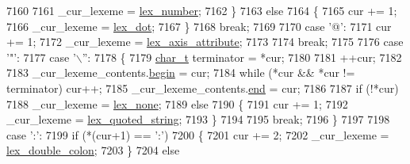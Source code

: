 \begin{DoxyCode}
7160                     
7161                     \_cur\_lexeme = \hyperlink{pugixml_8cpp_a1fdd6d0a63acbba1491ab331ddce4ac9abe562e581d64a34b55b3d9b38db2e480}{lex\_number};
7162                 \}
7163                 \textcolor{keywordflow}{else}
7164                 \{
7165                     cur += 1;
7166                     \_cur\_lexeme = \hyperlink{pugixml_8cpp_a1fdd6d0a63acbba1491ab331ddce4ac9aa0709f7aad925098c9b62379206a536b}{lex\_dot};
7167                 \}
7168                 \textcolor{keywordflow}{break};
7169 
7170             \textcolor{keywordflow}{case} \textcolor{charliteral}{'@'}:
7171                 cur += 1;
7172                 \_cur\_lexeme = \hyperlink{pugixml_8cpp_a1fdd6d0a63acbba1491ab331ddce4ac9a408fe857bc6c9b3a148ab798d0ad34e7}{lex\_axis\_attribute};
7173 
7174                 \textcolor{keywordflow}{break};
7175 
7176             \textcolor{keywordflow}{case} \textcolor{charliteral}{'"'}:
7177             \textcolor{keywordflow}{case} \textcolor{charliteral}{'\(\backslash\)''}:
7178             \{
7179                 \hyperlink{namespacepugi_aef5a7a62cba0507542220ea15afe39df}{char\_t} terminator = *cur;
7180 
7181                 ++cur;
7182 
7183                 \_cur\_lexeme\_contents.\hyperlink{structxpath__lexer__string_a0b985863d7363a75d4fdd0a7ece1fca0}{begin} = cur;
7184                 \textcolor{keywordflow}{while} (*cur && *cur != terminator) cur++;
7185                 \_cur\_lexeme\_contents.\hyperlink{structxpath__lexer__string_a13bbedeca2f8c2fb1e294325eea66878}{end} = cur;
7186                 
7187                 \textcolor{keywordflow}{if} (!*cur)
7188                     \_cur\_lexeme = \hyperlink{pugixml_8cpp_a1fdd6d0a63acbba1491ab331ddce4ac9a6696dceb02e4d282197154d3805e8ce1}{lex\_none};
7189                 \textcolor{keywordflow}{else}
7190                 \{
7191                     cur += 1;
7192                     \_cur\_lexeme = \hyperlink{pugixml_8cpp_a1fdd6d0a63acbba1491ab331ddce4ac9a1f793e76227244d2ae78acf451b82808}{lex\_quoted\_string};
7193                 \}
7194 
7195                 \textcolor{keywordflow}{break};
7196             \}
7197 
7198             \textcolor{keywordflow}{case} \textcolor{charliteral}{':'}:
7199                 \textcolor{keywordflow}{if} (*(cur+1) == \textcolor{charliteral}{':'})
7200                 \{
7201                     cur += 2;
7202                     \_cur\_lexeme = \hyperlink{pugixml_8cpp_a1fdd6d0a63acbba1491ab331ddce4ac9afbd9c771f4154c9cf363ff3c0b9f7b9c}{lex\_double\_colon};
7203                 \}
7204                 \textcolor{keywordflow}{else}

\end{DoxyCode}
